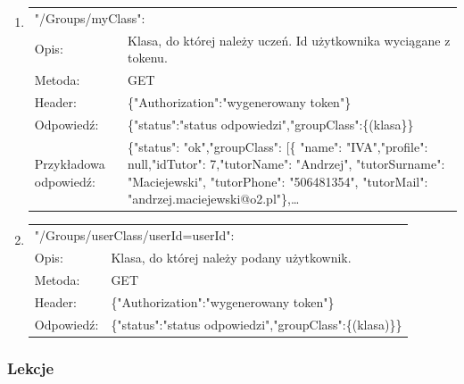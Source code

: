 \documentclass[12pt, titlepage]{article}
\begin{document}
\begin{enumerate}
	\item 
	{\renewcommand{\arraystretch}{1.5}
	\begin{tabular}[t]{p{3cm} p{15cm}}
	\multicolumn{2}{l}{"/Groups/myClass":} \\
	Opis: &  Klasa, do której należy uczeń. \newline Id użytkownika wyciągane z tokenu.\\
	Metoda: & GET \\
	Header: & \{"Authorization":"wygenerowany token"\} \\
	Odpowiedź: & \{"status":"status odpowiedzi",\newline "groupClass":\{(klasa\}\} \\
	Przykładowa \newline odpowiedź: & \{"status": "ok",\newline "groupClass": [\newline \{ "name": "IVA",\newline "profile": null,\newline "idTutor": 7,\newline "tutorName": "Andrzej", \newline "tutorSurname": "Maciejewski", \newline
	"tutorPhone": "506481354",\newline
        "tutorMail": "andrzej.maciejewski@o2.pl"\},\newline \ldots
	\end{tabular}}
	
	\item 
	{\renewcommand{\arraystretch}{1.5}
	\begin{tabular}[t]{p{3cm} p{15cm}}
	\multicolumn{2}{l}{"/Groups/userClass/userId={userId}":} \\
	Opis: &  Klasa, do której należy podany użytkownik. \\
	Metoda: & GET \\
	Header: & \{"Authorization":"wygenerowany token"\} \\
	Odpowiedź: & \{"status":"status odpowiedzi",\newline "groupClass":\{(klasa)\}\}
	\end{tabular}}
\end{enumerate}

\subsubsection{Lekcje}
\end{document}
